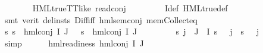 \begin{isabellebody}
\ \ \ \ \ \ \isamarkupfalse%
\ HML{\isacharunderscore}{\kern0pt}true{\isacharunderscore}{\kern0pt}TT{\isacharunderscore}{\kern0pt}like\ read{\isacharunderscore}{\kern0pt}conj\ {}\isanewline
\ \ \ \ \ \ \isamarkupfalse%
\ I{\isacharprime}{\kern0pt}{\isacharunderscore}{\kern0pt}def\ HML{\isacharunderscore}{\kern0pt}true{\isacharunderscore}{\kern0pt}def\ \isanewline
\ \ \ \ \ \ \isamarkupfalse%
\ {\isacharparenleft}{\kern0pt}smt\ {\isacharparenleft}{\kern0pt}verit{\isacharcomma}{\kern0pt}\ del{\isacharunderscore}{\kern0pt}insts{\isacharparenright}{\kern0pt}\ Diff{\isacharunderscore}{\kern0pt}iff\ hml{\isacharunderscore}{\kern0pt}sem{\isacharunderscore}{\kern0pt}conj\ mem{\isacharunderscore}{\kern0pt}Collect{\isacharunderscore}{\kern0pt}eq{\isacharparenright}{\kern0pt}\isanewline
\ \ \ \ \isamarkupfalse%
\ {\isachardoublequoteopen}{\isacharparenleft}{\kern0pt}{\isasymforall}s{\isachardot}{\kern0pt}\ {\isacharparenleft}{\kern0pt}s\ {\isasymTurnstile}\ hml{\isacharunderscore}{\kern0pt}conj\ I\ J\ {\isasymPhi}{\isacharparenright}{\kern0pt}\ {\isacharequal}{\kern0pt}\ {\isacharparenleft}{\kern0pt}s\ {\isasymTurnstile}\ {\isacharparenleft}{\kern0pt}hml{\isacharunderscore}{\kern0pt}conj\ I{\isacharprime}{\kern0pt}\ J\ {\isasymPsi}{\isacharparenright}{\kern0pt}{\isacharparenright}{\kern0pt}{\isacharparenright}{\kern0pt}{\isachardoublequoteclose}\isanewline
\ \ \ \ \ \ \isamarkupfalse%
\ {\isacartoucheopen}{\isacharparenleft}{\kern0pt}{\isasymforall}s{\isachardot}{\kern0pt}\ {\isasymforall}j\ {\isasymin}\ J\ {\isasymunion}\ I{\isacharprime}{\kern0pt}{\isachardot}{\kern0pt}\ {\isacharparenleft}{\kern0pt}{\isasymnot}{\isacharparenleft}{\kern0pt}s\ {\isasymTurnstile}\ {\isacharparenleft}{\kern0pt}{\isasymPsi}\ j{\isacharparenright}{\kern0pt}{\isacharparenright}{\kern0pt}\ {\isacharequal}{\kern0pt}\ {\isacharparenleft}{\kern0pt}{\isasymnot}{\isacharparenleft}{\kern0pt}s\ {\isasymTurnstile}\ {\isacharparenleft}{\kern0pt}{\isasymPhi}\ j{\isacharparenright}{\kern0pt}{\isacharparenright}{\kern0pt}{\isacharparenright}{\kern0pt}{\isacharparenright}{\kern0pt}{\isacharparenright}{\kern0pt}{\isacartoucheclose}\isanewline
\ \ \ \ \ \ \isamarkupfalse%
\ simp\isanewline
\ \ \ \ \isamarkupfalse%
\ {\isachardoublequoteopen}hml{\isacharunderscore}{\kern0pt}readiness\ {\isacharparenleft}{\kern0pt}hml{\isacharunderscore}{\kern0pt}conj\ I{\isacharprime}{\kern0pt}\ J\ {\isasymPsi}{\isacharparenright}{\kern0pt}{\isachardoublequoteclose}\ \isanewline
\ \ \ \ \ \ \isamarkupfalse%

\end{isabellebody}
